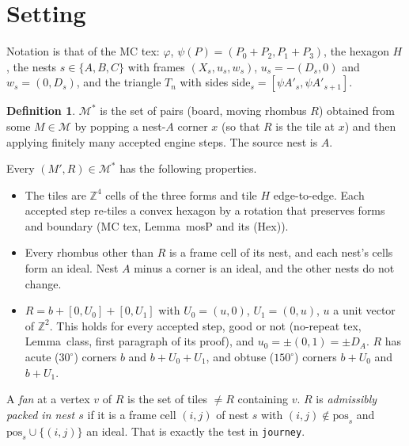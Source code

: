 \documentclass[11pt]{article}
\theoremstyle{definition}\newtheorem{definition}[theorem]{Definition}\newtheorem{remark}[theorem]{Remark}
\newcommand{\Z}{\mathbb Z}\newcommand{\R}{\mathbb R}
\newcommand{\M}{\mathcal M}
\begin{document}
\section{Setting}\label{sec:set}
Notation is that of the MC tex: $\varphi$, $\psi(P)=(P_0+P_2,P_1+P_3)$, the hexagon $H$, the nests $s\in\{A,B,C\}$ with frames $(X_s,u_s,w_s)$, $u_s=-(D_s,0)$ and $w_s=(0,D_s)$, and the triangle $T_n$ with sides $\mathrm{side}_s=[\psi A'_s,\psi A'_{s+1}]$.
\begin{definition}\label{def:Mstar}
$\M^*$ is the set of pairs (board, moving rhombus $R$) obtained from some $M\in\M$ by popping a nest-$A$ corner $x$ (so that $R$ is the tile at $x$) and then applying finitely many accepted engine steps. The source nest is $A$.
\end{definition}
\noindent Every $(M',R)\in\M^*$ has the following properties.
\begin{itemize}
\item[(i), (ii)] The tiles are $\Z^4$ cells of the three forms and tile $H$ edge-to-edge. Each accepted step re-tiles a convex hexagon by a rotation that preserves forms and boundary (MC tex, Lemma~mosP and its (Hex)).
\item[(iii$^*$)] Every rhombus other than $R$ is a frame cell of its nest, and each nest's cells form an ideal. Nest $A$ minus a corner is an ideal, and the other nests do not change.
\item[(R)] $R=b+[0,U_0]+[0,U_1]$ with $U_0=(u,0)$, $U_1=(0,u)$, $u$ a unit vector of $\Z^2$. This holds for every accepted step, good or not (no-repeat tex, Lemma~class, first paragraph of its proof), and $u_0=\pm(0,1)=\pm D_A$. $R$ has acute ($30^\circ$) corners $b$ and $b+U_0+U_1$, and obtuse ($150^\circ$) corners $b+U_0$ and $b+U_1$.
\end{itemize}
A \emph{fan} at a vertex $v$ of $R$ is the set of tiles $\ne R$ containing $v$. $R$ is \emph{admissibly packed in nest $s$} if it is a frame cell $(i,j)$ of nest $s$ with $(i,j)\notin\mathrm{pos}_s$ and $\mathrm{pos}_s\cup\{(i,j)\}$ an ideal. That is exactly the test in \texttt{journey}.
\end{document}
